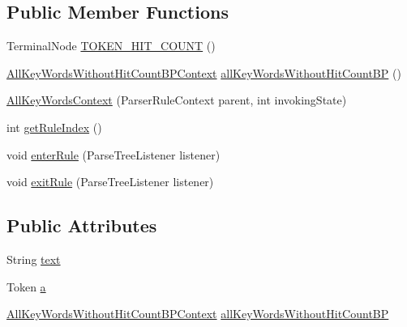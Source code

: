 \subsection*{Public Member Functions}
\begin{DoxyCompactItemize}
\item 
Terminal\+Node \hyperlink{classgov_1_1nasa_1_1jpf_1_1inspector_1_1client_1_1parser_1_1_console_grammar_parser_1_1_all_key_words_context_af5495eaaf7b5acde5247d07556d4b16e}{T\+O\+K\+E\+N\+\_\+\+H\+I\+T\+\_\+\+C\+O\+U\+NT} ()
\item 
\hyperlink{classgov_1_1nasa_1_1jpf_1_1inspector_1_1client_1_1parser_1_1_console_grammar_parser_1_1_all_key_4612626c1f72cea22831f9624187dc64}{All\+Key\+Words\+Without\+Hit\+Count\+B\+P\+Context} \hyperlink{classgov_1_1nasa_1_1jpf_1_1inspector_1_1client_1_1parser_1_1_console_grammar_parser_1_1_all_key_words_context_a312c7d2e9f9ee3fbcc7f89aa49f9343c}{all\+Key\+Words\+Without\+Hit\+Count\+BP} ()
\item 
\hyperlink{classgov_1_1nasa_1_1jpf_1_1inspector_1_1client_1_1parser_1_1_console_grammar_parser_1_1_all_key_words_context_af5b65e2b6692bac339f33c838449a091}{All\+Key\+Words\+Context} (Parser\+Rule\+Context parent, int invoking\+State)
\item 
int \hyperlink{classgov_1_1nasa_1_1jpf_1_1inspector_1_1client_1_1parser_1_1_console_grammar_parser_1_1_all_key_words_context_ae102b5118850ce73307a9d2353402bb9}{get\+Rule\+Index} ()
\item 
void \hyperlink{classgov_1_1nasa_1_1jpf_1_1inspector_1_1client_1_1parser_1_1_console_grammar_parser_1_1_all_key_words_context_a40ba7a1f6971844a50664352d6f5ba12}{enter\+Rule} (Parse\+Tree\+Listener listener)
\item 
void \hyperlink{classgov_1_1nasa_1_1jpf_1_1inspector_1_1client_1_1parser_1_1_console_grammar_parser_1_1_all_key_words_context_a34674ebe7e46b4e632c5309e0d6abb5c}{exit\+Rule} (Parse\+Tree\+Listener listener)
\end{DoxyCompactItemize}
\subsection*{Public Attributes}
\begin{DoxyCompactItemize}
\item 
String \hyperlink{classgov_1_1nasa_1_1jpf_1_1inspector_1_1client_1_1parser_1_1_console_grammar_parser_1_1_all_key_words_context_a22ba3764c33eaf37c5105ee71471258d}{text}
\item 
Token \hyperlink{classgov_1_1nasa_1_1jpf_1_1inspector_1_1client_1_1parser_1_1_console_grammar_parser_1_1_all_key_words_context_a420384c2aa1370540370291bc9028662}{a}
\item 
\hyperlink{classgov_1_1nasa_1_1jpf_1_1inspector_1_1client_1_1parser_1_1_console_grammar_parser_1_1_all_key_4612626c1f72cea22831f9624187dc64}{All\+Key\+Words\+Without\+Hit\+Count\+B\+P\+Context} \hyperlink{classgov_1_1nasa_1_1jpf_1_1inspector_1_1client_1_1parser_1_1_console_grammar_parser_1_1_all_key_words_context_a9ea5219f3e0da59e85411e17f445e715}{all\+Key\+Words\+Without\+Hit\+Count\+BP}
\end{DoxyCompactItemize}


